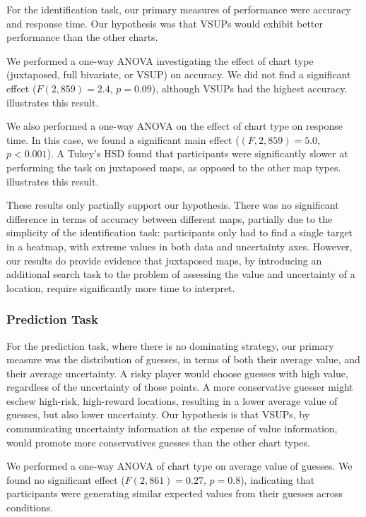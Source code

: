 For the identification task, our primary measures of performance were accuracy and response time. Our hypothesis was that VSUPs would exhibit better performance than the other charts.

We performed a one-way ANOVA investigating the effect of chart type (juxtaposed, full bivariate, or VSUP) on accuracy. We did not find a significant effect ($F(2,859) = 2.4$, $p=0.09$), although VSUPs had the highest accuracy.  illustrates this result.

We also performed a one-way ANOVA on the effect of chart type on response time. In this case, we found a significant main effect ($(F,2,859) = 5.0$, $p<0.001$). A Tukey's HSD found that participants were significantly slower at performing the task on juxtaposed maps, as opposed to the other map types.  illustrates this result.

These results only partially support our hypothesis. There was no significant difference in terms of accuracy between different maps, partially due to the simplicity of the identification task: participants only had to find a single target in a heatmap, with extreme values in both data and uncertainty axes. However, our results do provide evidence that juxtaposed maps, by introducing an additional search task to the problem of assessing the value and uncertainty of a location, require significantly more time to interpret.

\subsubsection{Prediction Task}

\uncertaintyFig

For the prediction task, where there is no dominating strategy, our primary measure was the distribution of guesses, in terms of both their average value, and their average uncertainty. A risky player would choose guesses with high value, regardless of the uncertainty of those points. A more conservative guesser might eschew high-risk, high-reward locations, resulting in a lower average value of guesses, but also lower uncertainty. Our hypothesis is that VSUPs, by communicating uncertainty information at the expense of value information, would promote more conservatives guesses than the other chart types.

We performed a one-way ANOVA of chart type on average value of guesses. We found no significant effect ($F(2,861)=0.27$, $p=0.8$), indicating that participants were generating similar expected values from their guesses across conditions.

